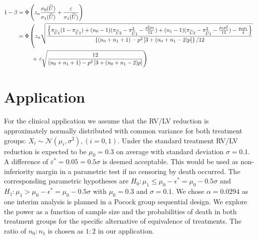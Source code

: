\documentclass[bimj,fleqn]{w-art}\usepackage[]{graphicx}\usepackage[]{color}
\theoremstyle{plain}
\theoremstyle{definition}
\begin{document}
  \begin{align*}
	  1 - \beta &= \Phi\left(z_{\alpha}\frac{\sigma_0(\widetilde{U})}{\sigma_1(\widetilde{U})} +
                            \frac{\varepsilon}{\sigma_1(\widetilde{U})} \right) \\
							&= \Phi\left(z_{\alpha}
							   \sqrt\frac{
								 \left\{ \pi_{\widetilde{U}1} (1 - \pi_{\widetilde{U}1})
								       + (n_0 - 1)( \pi_{\widetilde{U}2} - \pi^2_{\widetilde{U}1} - \frac{p_0^2 p_1}{12})
											 + (n_1 - 1)( \pi_{\widetilde{U}3} - \pi^2_{\widetilde{U}1} - \frac{p_0 p_1^2}{12})
											 - \frac{p_0 p_1}{4}
								\right\}}{\left\{ (n_0 + n_1 +1) -
                p^2 \left[ 3 +(n_0 + n_1 -2) p \right] \right\} / 12 } \right. \\
							&{\hphantom{= \Phi\bigg(}} + \left.
							  \varepsilon \sqrt\frac{12}{(n_0 + n_1 +1) -
                p^2 \left[ 3 +(n_0 + n_1 -2) p \right]} \right)
  \end{align*}


  \section{Application}
  \label{sec:Application}
	For the clinical application we assume that the RV/LV reduction is approximately normally distributed
	with common variance for both treatment groups:
	$X_i \sim \mathcal{N} ( \mu_i, \sigma^2 ), (i = 0, 1)$. Under the standard treatment RV/LV reduction
	is expected to be $\mu_0 = 0.3$ on average with standard deviation $\sigma= 0.1$. A difference of
	$\varepsilon^{*} = 0.05 = 0.5 \sigma$ is deemed acceptable. This would be used as non-inferiority
	margin in a parametric test if no censoring by death occurred. The corresponding parametric hypotheses
	are $H_0: \mu_1 \leq \mu_0 - \epsilon^{*}  = \mu_0 - 0.5 \sigma $ and
	$H_1: \mu_1 > \mu_0 - \epsilon^{*} = \mu_0 - 0.5 \sigma $ with $\mu_0 = 0.3$ and $\sigma = 0.1$.
	We chose $\alpha = 0.0294$ as one interim analysis is planned in a Pocock group sequential design.
  We explore the power as a function of sample size and the probabilities of death in
	both treatment groups for the specific alternative of equivalence of treatments.
	The ratio of $n_0 : n_1$ is chosen as $1 : 2 $ in our application.
\end{document}
